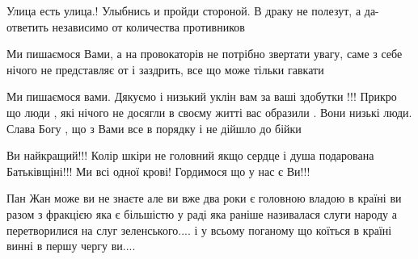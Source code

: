 \begin{itemize}
Улица есть улица.! Улыбнись и пройди стороной. В драку не полезут, а
да-ответить независимо от количества противников


 

Ми пишаємося Вами, а на провокаторів не потрібно звертати увагу, саме з себе
нічого не представляє от і заздрить, все що може тільки гавкати


 

Ми пишаємося вами. Дякуємо і низький уклін вам за ваші здобутки !!! Прикро що
люди , які нічого не досягли в своєму житті вас образили . Вони низькі люди.
Слава Богу , що з Вами все в порядку і не дійшло до бійки



 
Ви найкращий!!! Колір шкіри не головний якщо сердце і душа подарована Батьківщіні!!! Ми всі одної крові! Гордимося що у нас є Ви!!!

 

Пан Жан може ви не знаєте але ви вже два роки є головною владою в країні ви
разом з фракцією яка є більшістю у раді яка раніше називалася слуги народу а
перетворилися на слуг зеленського.... і у всьому поганому що коїться в країні
винні в першу чергу ви....


 


\end{itemize}
